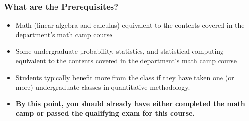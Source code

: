 \documentclass[xcolor=svgnames,9pt,english,aspectratio=169,t]{beamer}
\begin{document}
\begin{frame}
\frametitle{What are the Prerequisites?}

\small
\begin{itemize}
\item Math (linear algebra and calculus) equivalent to the contents covered in the department's math camp course 
\item Some undergraduate probability, statistics, and statistical computing equivalent to the contents covered in the department's math camp course 
\item Students typically benefit more from the class if they have taken one (or more) undergraduate classes in quantitative methodology. \bigskip
\item {\bf By this point, you should already have either completed the math camp or passed the qualifying exam for this course.}
\end{itemize}
\end{frame}
\end{document}
